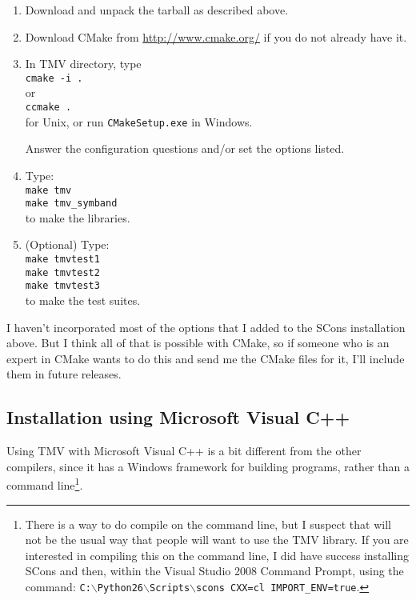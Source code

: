 \documentclass[twoside,letterpaper,11pt]{article}
\begin{document}
\begin{enumerate}
\item Download and unpack the tarball as described above.

\item
Download CMake from \url{http://www.cmake.org/} if you do not already have it.

\item
In TMV directory, type\\
\texttt{cmake -i .}\\
or\\
\texttt{ccmake .}\\
for Unix, or run \texttt{CMakeSetup.exe} in Windows.

Answer the configuration questions and/or set the options listed.

\item
Type:\\
\texttt{make tmv}\\
\texttt{make tmv\_symband}\\
to make the libraries.

\item
(Optional) Type:\\
\texttt{make tmvtest1}\\
\texttt{make tmvtest2}\\
\texttt{make tmvtest3}\\
to make the test suites.

\end{enumerate}

I haven't incorporated most of the options that I added to the SCons installation above.
But I think all of that is possible with CMake, so if someone who is an expert in CMake wants
to do this and send me the CMake files for it, I'll include them in future releases.

\subsection{Installation using Microsoft Visual C++}

Using TMV with Microsoft Visual C++ is a bit different from the other compilers,
since it has a Windows framework for building programs, rather than a command 
line\footnote{
There is a way to do compile on the command line, but I suspect that will not be the 
usual way that people will want to use the TMV library.  If you are interested in compiling
this on the command line, I did have success installing SCons and then, within the
Visual Studio 2008 Command Prompt, using the command:
\texttt{C:$\backslash$Python26$\backslash$Scripts$\backslash$scons CXX=cl IMPORT\_ENV=true}.}.
\end{document}
